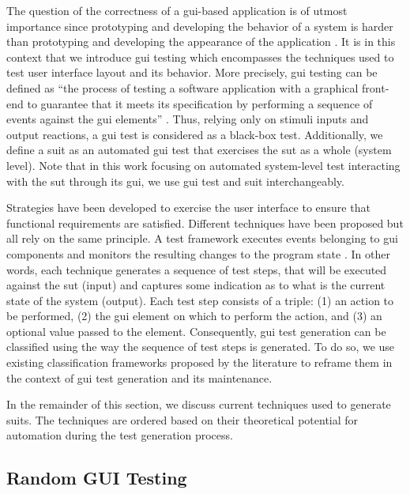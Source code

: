 The question of the correctness of a \gls{gui}-based application is of utmost importance since prototyping and developing the behavior of a system is harder than prototyping and developing the appearance of the application \cite{Myers2008}. It is in this context that we introduce \gls{gui} testing which encompasses the techniques used to test user interface layout and its behavior. More precisely, \gls{gui} testing can be defined as ``the process of testing a software application with a graphical front-end to guarantee that it meets its specification by performing a sequence of events against the \gls{gui} elements'' \cite{Cunha2010, Banerjee2013, Issa2012}. Thus, relying only on stimuli inputs and output reactions, a \gls{gui} test is considered as a black-box test. Additionally, we define a \gls{suit} as an automated \gls{gui} test that exercises the \gls{sut} as a whole (system level). Note that in this work focusing on automated system-level test interacting with the \gls{sut} through its \gls{gui}, we use \gls{gui} test and \gls{suit} interchangeably.

Strategies have been developed to exercise the user interface to ensure that functional requirements are satisfied. Different techniques have been proposed but all rely on the same principle. A test framework executes events belonging to \gls{gui} components and monitors the resulting changes to the program state \cite{Nguyen2014}. In other words, each technique generates a sequence of test steps, that will be executed against the \gls{sut} (input) and captures some indication as to what is the current state of the system (output). Each test step consists of a triple: (1) an action to be performed, (2) the \gls{gui} element on which to perform the action, and (3) an optional value passed to the element. Consequently, \gls{gui} test generation can be classified using the way the sequence of test steps is generated. To do so, we use existing classification frameworks proposed by the literature \cite{Anand2013, Amalfitano2017} to reframe them in the context of \gls{gui} test generation and its maintenance.

In the remainder of this section, we discuss current techniques used to generate \gls{suit}s. The techniques are ordered based on their theoretical potential for automation during the test generation process.

\subsection{Random GUI Testing}
\label{sec:introduction-random-gui-testing}

